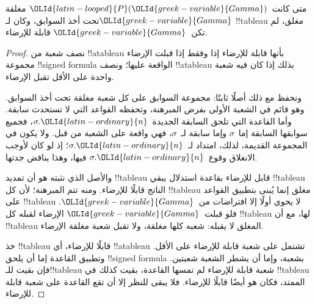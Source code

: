 \documentclass[../../../include/open-logic-section]{subfiles}
\begin{document}
\begin{thm}[السلامة]
  متى كانت~${\OLId{latin-looped}{P}}({\OLId{greek-variable}{Gamma}})$ مغلقة تحت أخذ السوابق، وكان لـ${\OLId{greek-variable}{Gamma}}$
  !!{tableau} مغلق، لم تكن~${\OLId{greek-variable}{Gamma}}$ قابلة للإرضاء.
\end{thm}

\begin{proof}
نصف شعبة من !!a{tableau} بأنها قابلة للإرضاء إذا وفقط إذا قبلت الإرضاء
مجموعة !!{signed formula} الواقعة عليها؛ ونصف !!a{tableau} بذلك إذا
كان فيه شعبة واحدة على الأقل تقبل الإرضاء.

ونحفظ مع ذلك أصلًا ثابتًا: مجموعة السوابق على كل شعبة مغلقة تحت أخذ
السوابق. وهو قائم في الشعبة الأولى بفرض المبرهنة، وتحفظه القواعد التي لا
تستحدث سابقة. وأما القاعدة التي تلحق السابقة الجديدة~$\sigma.{\OLId{latin-ordinary}{n}}$، فجميع
سوابقها السابقة إما~$\sigma$ وإما سابقة لـ~$\sigma$، فهي واقعة على
الشعبة من قبل. ولا يكون في المجموعة القديمة، لذلك، امتداد لـ~$\sigma.{\OLId{latin-ordinary}{n}}$؛
إذ لو كان لأوجب الانغلاق وقوع~$\sigma.{\OLId{latin-ordinary}{n}}$ فيها، وهذا يناقض جدتها.

والأصل الذي نثبته هو أن تمديد !!{tableau} قابل للإرضاء بقاعدة استدلال
يبقي !!{tableau} الناتج قابلًا للإرضاء. ومنه تتم المبرهنة؛ لأن كل
!!{tableau} مغلق إنما يُبنى بتطبيق القواعد على !!{tableau} لا يحوي
أولًا إلا افتراضات من~${\OLId{greek-variable}{Gamma}}$. فلو قبلت~${\OLId{greek-variable}{Gamma}}$ الإرضاء لقبله كل
!!{tableau} لها، مع أن !!{tableau} المغلق لا يقبله: شعبه كلها مغلقة،
ولا تقبل شعبة مغلقة الإرضاء.

خذ !!{tableau} قابلًا للإرضاء، أي !!a{tableau} تشتمل على شعبة قابلة
للإرضاء على الأقل. وتطبيق القاعدة إما أن يلحق !!{signed formula}
بشعبة، وإما أن يشطر الشعبة شعبتين. فإن بقيت للـ!!{tableau} شعبة قابلة للإرضاء لم تمسها
القاعدة، بقيت كذلك في !!{tableau} الممتد، فكان هو أيضًا قابلًا للإرضاء.
فلا يبقى للنظر إلا أن تقع القاعدة على شعبة قابلة للإرضاء.


\end{proof}
\end{document}
